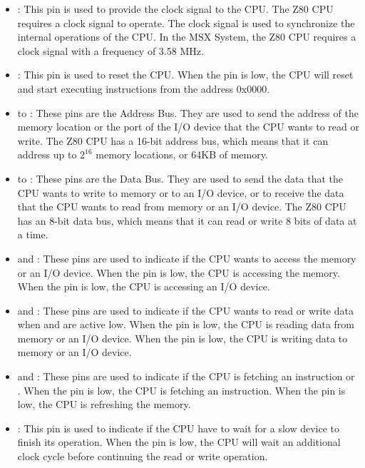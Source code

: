 \begin{itemize}
    \item {}: This pin is used to provide the clock signal to the CPU. The Z80 CPU requires a
    clock signal to operate. The clock signal is used to synchronize the internal operations of the
    CPU. In the MSX System, the Z80 CPU requires a clock signal with a frequency of 3.58 MHz.    
    \item {}: This pin is used to reset the CPU. When the  pin is low, the CPU
    will reset and start executing instructions from the address 0x0000. 
    \item {} to : These pins are the Address Bus. They are used to send the address
    of the memory location or the port of the I/O device that the CPU wants to read or write. The
    Z80 CPU has a 16-bit address bus, which means that it can address up to $2^{16}$ memory
    locations, or 64KB of memory. 
    \item {} to : These pins are the Data Bus. They are used to send the data that the
    CPU wants to write to memory or to an I/O device, or to receive the data that the CPU wants to
    read from memory or an I/O device. The Z80 CPU has an 8-bit data bus, which means that it can
    read or write 8 bits of data at a time.
    \item {} and : These pins are used to indicate if the CPU wants to access the
    memory or an I/O device. When the  pin is low, the CPU is accessing the memory. When
    the  pin is low, the CPU is accessing an I/O device.
    \item {} and : These pins are used to indicate if the CPU wants to read or write
    data when  and  are active low. When the  pin is low, the CPU is
    reading data from memory or an I/O device. When the  pin is low, the CPU is writing data
    to memory or an I/O device.
    \item {} and : These pins are used to indicate if the CPU is fetching an
    instruction or . When the  pin is low, the CPU is fetching
    an instruction. When the  pin is low, the CPU is refreshing the memory.
    \item {}: This pin is used to indicate if the CPU have to wait for a slow device to
    finish its operation. When the  pin is low, the CPU will wait an additional clock
    cycle before continuing the read or write operation. 

\end{itemize}
